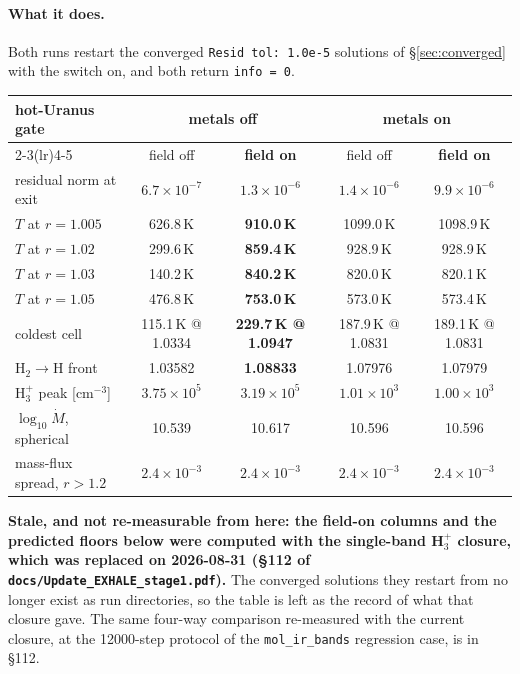 \documentclass[english,a4paper]{my_memo}
\newcommand{\Mdot}{\dot{M}}
\begin{document}
\paragraph{What it does.} Both runs restart the converged
\texttt{Resid tol: 1.0e-5} solutions of \S\ref{sec:converged} with the switch on,
and both return \texttt{info = 0}.

\begin{center}\small
\begin{tabular}{@{}lcccc@{}}
\toprule
hot-Uranus gate & \multicolumn{2}{c}{metals off} & \multicolumn{2}{c}{metals on} \\
\cmidrule(lr){2-3}\cmidrule(lr){4-5}
 & field off & \textbf{field on} & field off & \textbf{field on} \\
\midrule
residual norm at exit & $6.7\!\times\!10^{-7}$ & $1.3\!\times\!10^{-6}$ & $1.4\!\times\!10^{-6}$ & $9.9\!\times\!10^{-6}$ \\
$T$ at $r=1.005$ & 626.8\,K & \textbf{910.0\,K} & 1099.0\,K & 1098.9\,K \\
$T$ at $r=1.02$  & 299.6\,K & \textbf{859.4\,K} &  928.9\,K &  928.9\,K \\
$T$ at $r=1.03$  & 140.2\,K & \textbf{840.2\,K} &  820.0\,K &  820.1\,K \\
$T$ at $r=1.05$  & 476.8\,K & \textbf{753.0\,K} &  573.0\,K &  573.4\,K \\
coldest cell & 115.1\,K @ 1.0334 & \textbf{229.7\,K @ 1.0947} & 187.9\,K @ 1.0831 & 189.1\,K @ 1.0831 \\
H$_2\to$H front & 1.03582 & \textbf{1.08833} & 1.07976 & 1.07979 \\
H$_3^+$ peak [cm$^{-3}$] & $3.75\!\times\!10^{5}$ & $3.19\!\times\!10^{5}$ & $1.01\!\times\!10^{3}$ & $1.00\!\times\!10^{3}$ \\
$\log_{10}\Mdot$, spherical & 10.539 & 10.617 & 10.596 & 10.596 \\
mass-flux spread, $r>1.2$ & $2.4\!\times\!10^{-3}$ & $2.4\!\times\!10^{-3}$ & $2.4\!\times\!10^{-3}$ & $2.4\!\times\!10^{-3}$ \\
\bottomrule
\end{tabular}
\end{center}

\noindent\textbf{Stale, and not re-measurable from here: the field-on columns
and the predicted floors below were computed with the single-band H$_3^+$
closure, which was replaced on 2026-08-31 (\S112 of
\texttt{docs/Update\_EXHALE\_stage1.pdf}).} The converged solutions they restart from no
longer exist as run directories, so the table is left as the record of what that
closure gave. The same four-way comparison re-measured with the current closure,
at the 12000-step protocol of the \texttt{mol\_ir\_bands} regression case, is in
\S112.
\end{document}
